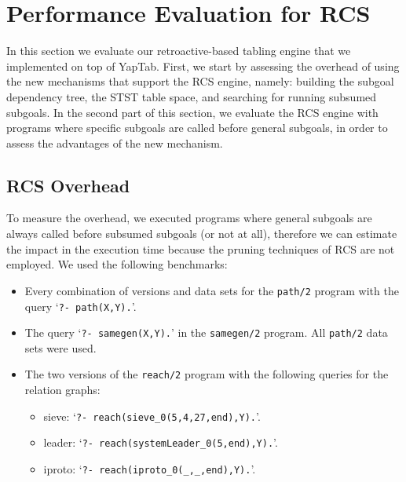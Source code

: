 

\section{Performance Evaluation for RCS}

In this section we evaluate our retroactive-based tabling engine that we implemented on
top of YapTab. First, we start by assessing the overhead of using the new mechanisms that
support the RCS engine, namely: building the subgoal dependency tree, the STST table space,
and searching for running subsumed subgoals. In the second part of this section, we evaluate
the RCS engine with programs where specific subgoals are called before general subgoals, in
order to assess the advantages of the new mechanism.

\subsection{RCS Overhead}

To measure the overhead, we executed programs where general subgoals are always called before
subsumed subgoals (or not at all), therefore we can estimate the impact in the execution time
because the pruning techniques of RCS are not employed.
We used the following benchmarks:

\begin{itemize}
   \item Every combination of versions and data sets for the \texttt{path/2} program with the query `\texttt{?-~path(X,Y).}'.
   
   \item The query `\texttt{?-~samegen(X,Y).}' in the \texttt{samegen/2} program. All \texttt{path/2} data
   sets were used.
   
   \item The two versions of the \texttt{reach/2} program with the following queries for the relation graphs:

   \begin{itemize}
      \item sieve: `\texttt{?-~reach(sieve\_0(5,4,27,end),Y).}'.
      \item leader: `\texttt{?-~reach(systemLeader\_0(5,end),Y).}'.
      \item iproto: `\texttt{?-~reach(iproto\_0(\_,\_,end),Y).}'.
   \end{itemize}
\end{itemize}

